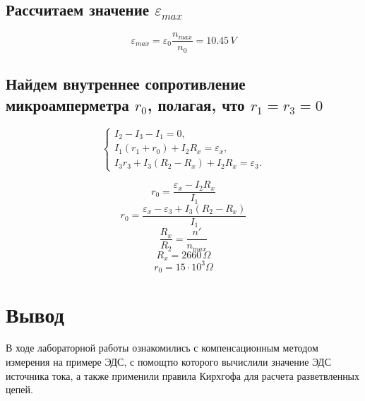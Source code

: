 \documentclass[a4paper,12pt]{report}
\begin{document}
\subsection*{Рассчитаем значение $\varepsilon_{max}$}

\[ \varepsilon_{max} = \varepsilon_0 \frac{n_{max}}{n_0} = 10.45 \, V \]

\subsection*{Найдем внутреннее сопротивление микроамперметра $r_0$, полагая, что $r_1 = r_3 = 0$}

\begin{equation*}
    \begin{cases}
      I_2 - I_3 - I_1 = 0, 
      \\
      I_1(r_1 + r_0) + I_2R_x = \varepsilon_x,
      \\
      I_3r_3 + I_3(R_2-R_x) + I_2R_x = \varepsilon_3.
    \end{cases}
   \end{equation*}

\[ r_0 = \frac{\varepsilon_x - I_2R_x}{I_1} \]
\[r_0 = \frac{\varepsilon_x - \varepsilon_3 + I_3(R_2-R_x)}{I_1}\]
\[ \frac{R_x}{R_2} = \frac{n'}{n_{max}} \]
\[ R_x = 2660 \, \Omega  \]
\[ r_0 = 15\cdot 10^{3} \Omega \]

\section*{Вывод}

В ходе лабораторной работы ознакомились с компенсационным методом измерения на примере ЭДС, с помощтю которого вычислили значение ЭДС источника тока, а также применили правила Кирхгофа для расчета разветвленных цепей.
\end{document}
